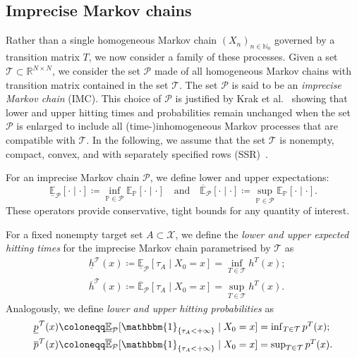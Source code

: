\documentclass{svproc}
\newcommand{\T}{\mathcal{T}}
\newcommand{\ulp}{\underline{p}}
\newcommand{\olp}{\overline{p}}
\newcommand{\ulh}{\underline{h}}
\newcommand{\olh}{\overline{h}}
\newcommand{\X}{\mathcal{X}}
\newcommand{\N}{\mathbb{N}}
\newcommand{\R}{\mathbb{R}}
\newcommand{\one}{\mathbbm{1}}
\newcommand{\PP}{\mathbb{P}}
\newcommand{\Pcal}{\mathcal{P}}
\newcommand{\EE}{\mathbb{E}}
\begin{document}
\subsection{Imprecise Markov chains}\label{sec:IMCs}
Rather than a single homogeneous Markov chain $(X_n)_{n\in\N_0}$ governed by a transition matrix $T$, we now consider a family of these processes. Given a set $\T\subset \R^{N\times N}$, we consider the set $\Pcal$ made of all homogeneous Markov chains with transition matrix contained in the set $\T$. The set $\Pcal$ is said to be an \textit{imprecise Markov chain} (IMC).  
This choice of $\Pcal$ is justified by Krak et al.~\cite[{Theorem 18}]{krak2019hitting} showing that lower and upper hitting times and probabilities remain unchanged when the set $\Pcal$ is enlarged to include all (time-)inhomogeneous Markov processes that are compatible with $\T$.
In the following, we assume that the set $\T$ is nonempty, compact, convex, and with separately specified rows (SSR)~\cite{HermansSkulj2014, krak2019hitting}.


For an imprecise Markov chain $\Pcal$, we define lower and upper expectations:
\[
\underline{\EE}_\Pcal[\cdot\mid\cdot] \coloneqq \inf_{\PP\in \Pcal} \EE_\PP[\cdot\mid\cdot] \quad \text{and} \quad \overline{\EE}_\Pcal[\cdot\mid\cdot] \coloneqq \sup_{\PP\in \Pcal} \EE_\PP[\cdot\mid\cdot].
\]
These operators provide conservative, tight bounds for any quantity of interest.

For a fixed nonempty target set $A\subset \X$, we define the \textit{lower and upper expected hitting times} for the imprecise Markov chain parametrised by $\T$ as 
\begin{align*}
    &\ulh^\T(x)\coloneqq \underline{\EE}_\Pcal[\tau_A\mid X_0=x] = \textstyle\inf_{T\in \T} h^T(x);\\
    &{\olh^\T(x)\coloneqq \overline{\EE}_\Pcal[\tau_A\mid X_0=x] = \textstyle\sup_{T\in \T}h^T(x).}
\end{align*}
Analogously, we define \textit{lower and upper hitting probabilities} as
\begin{align*}
    &\ulp^\T(x)\coloneqq \underline{\EE}_\Pcal[\one_{\{\tau_A<+\infty\}}\mid X_0=x] = \textstyle\inf_{T\in \T}p^T(x);\\
    &{\olp^\T(x)\coloneqq \overline{\EE}_\Pcal[\one_{\{\tau_A<+\infty\}}\mid X_0=x] = \textstyle\sup_{T\in \T}p^T(x).}
\end{align*}
\end{document}
